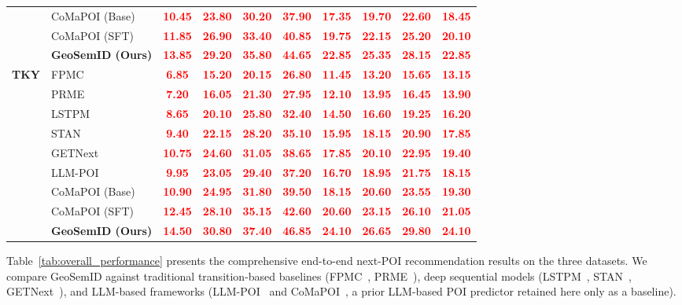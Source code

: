 \documentclass[journal]{IEEEtran}
\newcommand{\mock}[1]{\textbf{\textcolor{red}{#1}}}
\begin{document}
\begin{table}[!t]
{\begin{tabular}{llcccccccc}
& CoMaPOI (Base) & \mock{10.45} & \mock{23.80} & \mock{30.20} & \mock{37.90} & \mock{17.35} & \mock{19.70} & \mock{22.60} & \mock{18.45} \\
& CoMaPOI (SFT) & \mock{11.85} & \mock{26.90} & \mock{33.40} & \mock{40.85} & \mock{19.75} & \mock{22.15} & \mock{25.20} & \mock{20.10} \\
& \textbf{GeoSemID (Ours)} & \mock{13.85} & \mock{29.20} & \mock{35.80} & \mock{44.65} & \mock{22.85} & \mock{25.35} & \mock{28.15} & \mock{22.85} \\ \midrule
\textbf{TKY} & FPMC & \mock{6.85} & \mock{15.20} & \mock{20.15} & \mock{26.80} & \mock{11.45} & \mock{13.20} & \mock{15.65} & \mock{13.15} \\
& PRME & \mock{7.20} & \mock{16.05} & \mock{21.30} & \mock{27.95} & \mock{12.10} & \mock{13.95} & \mock{16.45} & \mock{13.90} \\
& LSTPM & \mock{8.65} & \mock{20.10} & \mock{25.80} & \mock{32.40} & \mock{14.50} & \mock{16.60} & \mock{19.25} & \mock{16.20} \\
& STAN & \mock{9.40} & \mock{22.15} & \mock{28.20} & \mock{35.10} & \mock{15.95} & \mock{18.15} & \mock{20.90} & \mock{17.85} \\
& GETNext & \mock{10.75} & \mock{24.60} & \mock{31.05} & \mock{38.65} & \mock{17.85} & \mock{20.10} & \mock{22.95} & \mock{19.40} \\
& LLM-POI & \mock{9.95} & \mock{23.05} & \mock{29.40} & \mock{37.20} & \mock{16.70} & \mock{18.95} & \mock{21.75} & \mock{18.15} \\
& CoMaPOI (Base) & \mock{10.90} & \mock{24.95} & \mock{31.80} & \mock{39.50} & \mock{18.15} & \mock{20.60} & \mock{23.55} & \mock{19.30} \\
& CoMaPOI (SFT) & \mock{12.45} & \mock{28.10} & \mock{35.15} & \mock{42.60} & \mock{20.60} & \mock{23.15} & \mock{26.10} & \mock{21.05} \\
& \textbf{GeoSemID (Ours)} & \mock{14.50} & \mock{30.80} & \mock{37.40} & \mock{46.85} & \mock{24.10} & \mock{26.65} & \mock{29.80} & \mock{24.10} \\ \bottomrule
\end{tabular}%
}
\end{table}

Table~\ref{tab:overall_performance} presents the comprehensive end-to-end next-POI recommendation results on the three datasets. We compare GeoSemID against traditional transition-based baselines (FPMC~\cite{rendle2010}, PRME~\cite{feng2015prme}), deep sequential models (LSTPM~\cite{sun2020lstpm}, STAN~\cite{luo2021stan}, GETNext~\cite{yang2022}), and LLM-based frameworks (LLM-POI~\cite{li2024llm4poi} and CoMaPOI~\cite{zhong2025}, a prior LLM-based POI predictor retained here only as a baseline).
\end{document}

